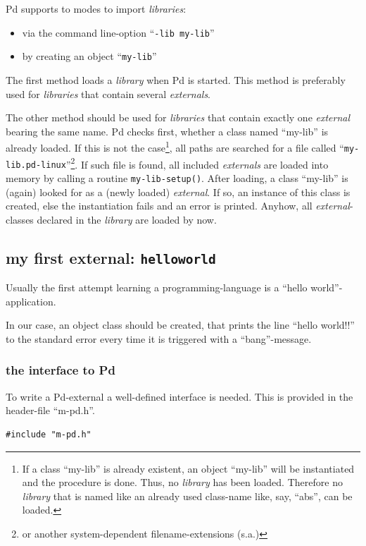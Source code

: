 \documentclass{ppgmus}
\begin{document}
Pd supports to modes to import {\em libraries}:

\begin{itemize}
\item via the command line-option ``{\tt -lib my-lib}''
\item by creating an object ``{\tt my-lib}''
\end{itemize}

The first method loads a {\em library} when Pd is started.
This method is preferably used for {\em libraries} that contain several {\em externals}.

The other method should be used for {\em libraries} that contain exactly
one {\em external} bearing the same name.
Pd checks first, whether a class named ``my-lib'' is already loaded.
If this is not the case\footnote{
If a class ``my-lib'' is already existent, an object ``my-lib'' will be instantiated
and the procedure is done. 
Thus, no {\em library} has been loaded.
Therefore no {\em library} that is named like an already used class-name like, say, ``abs'',
can be loaded.}, all paths are searched for a file called
``{\tt my-lib.pd-linux}''\footnote{or another system-dependent filename-extensions (s.a.)}.
If such file is found, all included {\em externals} are loaded into memory by calling a
routine \verb+my-lib-setup()+.
After loading, a class ``my-lib'' is (again) looked for as a (newly loaded) {\em external}.
If so, an instance of this class is created, else the instantiation fails and an error is
printed.
Anyhow, all {\em external}-classes declared in the {\em library} are loaded by now.


\subsection{my first external: {\tt helloworld}}
Usually the first attempt learning a programming-language is a ``hello world''-application.

In our case, an object class should be created, that prints the line ``hello world!!'' to
the standard error every time it is triggered with a ``bang''-message.



\subsubsection{the interface to Pd}
To write a Pd-external a well-defined interface is needed.
This is provided in the header-file ``m-pd.h''.

\begin{verbatim}
#include "m-pd.h"
\end{verbatim}
\end{document}

